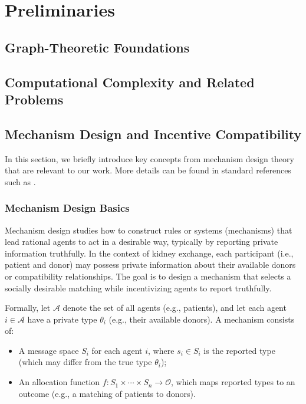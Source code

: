 \chapter{Preliminaries}
\label{cha:preliminaries}


\section{Graph-Theoretic Foundations}


\section{Computational Complexity and Related Problems}

\section{Mechanism Design and Incentive Compatibility}

In this section, we briefly introduce key concepts from mechanism design theory that are relevant to our work. More details can be found in standard references such as \cite{Roughgarden_2016}.

\subsection*{Mechanism Design Basics}

Mechanism design studies how to construct rules or systems (mechanisms) that lead rational agents to act in a desirable way, typically by reporting private information truthfully. In the context of kidney exchange, each participant (i.e., patient and donor) may possess private information about their available donors or compatibility relationships. The goal is to design a mechanism that selects a socially desirable matching while incentivizing agents to report truthfully.

Formally, let $\mathcal{A}$ denote the set of all agents (e.g., patients), and let each agent $i \in \mathcal{A}$ have a private type $\theta_i$ (e.g., their available donors). A mechanism consists of:
\begin{itemize}
    \item A message space $S_i$ for each agent $i$, where $s_i \in S_i$ is the reported type (which may differ from the true type $\theta_i$);
    \item An allocation function $f : S_1 \times \cdots \times S_n \rightarrow \mathcal{O}$, which maps reported types to an outcome (e.g., a matching of patients to donors).
\end{itemize}

